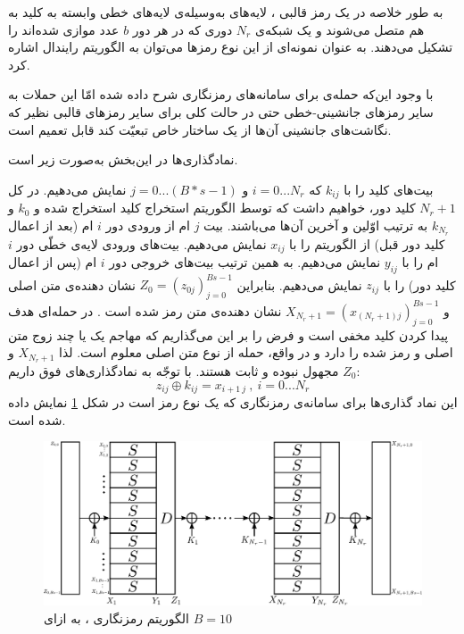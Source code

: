       به طور خلاصه در یک رمز قالبی 
      ،
      لایه‌های 
      به‌وسیله‌ی لایه‌های خطی وابسته به کلید به هم متصل می‌شوند و یک شبکه‌ی 
      $N_{r}$
      دوری که در هر دور 
      $b$
      عدد 
      موازی شده‌اند را تشکیل می‌دهند. به عنوان نمونه‌ای از این نوع رمزها می‌توان به الگوریتم رایندال
 اشاره کرد. 
  
 با وجود این‌که حمله‌ی 
  برای سامانه‌های رمزنگاری 
  شرح داده شده امّا این حملات به سایر رمز‌های جانشینی-خطی
 حتی در حالت کلی برای سایر رمزهای قالبی نظیر 
  که نگاشت‌های جانشینی آن‌ها از یک ساختار خاص تبعیّت کند قابل تعمیم است.
  
  
  نمادگذاری‌ها در این‌بخش به‌صورت زیر است. 
  
  
  بیت‌های  کلید را با 
  $k_{ij}$
  که 
  $i = 0...N_{r}$
  و
  $j = 0...(B*s - 1)$
  نمایش می‌دهیم. در کل 
  $N_{r}+1$
  کلید دور، خواهیم داشت که توسط الگوریتم استخراج کلید 
  استخراج شده و
  $k_{0}$
  و
  $k_{N_{r}}$
  به ترتیب اوّلین و آخرین‌ آن‌ها می‌باشند. بیت 
  $j$
  ام از ورودی دور 
  $i$
  ام (بعد از اعمال کلید دور قبل) از الگوریتم را با 
  $x_{ij}$
  نمایش می‌دهیم. بیت‌های  ورودی‌ لایه‌ی خطّی دور 
  $i$
  ام را با 
  $y_{ij}$
  نمایش می‌دهیم. به همین ترتیب بیت‌های خروجی دور 
  $i$
  ام (پس از اعمال کلید دور) را با 
  $z_{ij}$
  نمایش می‌دهیم. بنابراین
  $Z_{0} = (z_{0j})_{j = 0}^{Bs - 1}$
  نشان دهنده‌ی متن اصلی و 
  $X_{N_{r}+1} = (x_{(N_{r}+1)j})_{j = 0}^{Bs - 1}$
  نشان دهنده‌ی متن رمز شده ‌است . در حمله‌ای 
  هدف پیدا کردن کلید مخفی است و فرض را بر این می‌گذاریم که مهاجم یک یا چند زوج  متن اصلی و رمز شده را دارد  و در واقع، حمله از نوع متن اصلی معلوم است. لذا 
  $X_{N_{r}+1}$
  و
  $Z_{0}$
  مجهول نبوده و ثابت هستند. با توجّه به نمادگذاری‌های فوق داریم:
  $$z_{ij} \oplus k_{ij} = x_{i+1 \ j} \ , \ i = 0...N_{r}$$
  این نماد گذاری‌ها برای سامانه‌ی رمزنگاری 
  که یک نوع رمز 
  است در شکل 
  \ref{fig:ctcb10}
  نمایش داده شده است. 
  \begin{figure}
\centering
\includegraphics[width=0.85\linewidth]{Images/CTC_10}
\caption{الگوریتم رمزنگاری 
	، 
	به ازای 
	$B = 10$}
\label{fig:ctcb10}
\end{figure}


